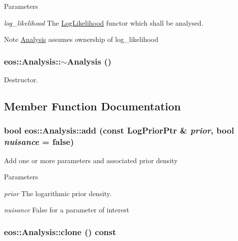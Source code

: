 \begin{DoxyParams}{Parameters}
\item[{\em log\_\-likelihood}]The \hyperlink{classeos_1_1LogLikelihood}{LogLikelihood} functor which shall be analysed.\end{DoxyParams}
\begin{DoxyNote}{Note}
\hyperlink{classeos_1_1Analysis}{Analysis} assumes ownership of log\_\-likelihood 
\end{DoxyNote}
\hypertarget{classeos_1_1Analysis_a41c872da6c87e398f1807012262a2eff}{
\subsubsection[{$\sim$Analysis}]{\setlength{\rightskip}{0pt plus 5cm}eos::Analysis::$\sim$Analysis ()}}
\label{classeos_1_1Analysis_a41c872da6c87e398f1807012262a2eff}


Destructor. 

\subsection{Member Function Documentation}
\hypertarget{classeos_1_1Analysis_a3062ad70d7888517d3fa09e7dcb183cf}{
\subsubsection[{add}]{\setlength{\rightskip}{0pt plus 5cm}bool eos::Analysis::add (const {\bf LogPriorPtr} \& {\em prior}, \/  bool {\em nuisance} = {\ttfamily false})}}
\label{classeos_1_1Analysis_a3062ad70d7888517d3fa09e7dcb183cf}
Add one or more parameters and associated prior density


\begin{DoxyParams}{Parameters}
\item[{\em prior}]The logarithmic prior density. \item[{\em nuisance}]False for a parameter of interest \end{DoxyParams}
\hypertarget{classeos_1_1Analysis_a05e85c6fa4f83ef4b768c52d4c4f75bc}{
\subsubsection[{clone}]{ eos::Analysis::clone () const}}
\label{classeos_1_1Analysis_a05e85c6fa4f83ef4b768c52d4c4f75bc}


